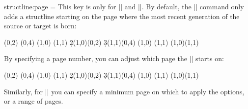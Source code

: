 \begin{sseqdata}[|| name = ex1, cohomological Serre grading]

\begin{key}{structline:page = }
This key is only for |\structline| and |\structlineoptions|. By default, the |\structline| command only adds a structline starting on the page where the most recent generation of the source or target is born:

\begin{codeexample}[width = 7.6cm]
\begin{sseqdata}[ name = structpage example,
                  title = \page, yscale = 0.53 ]
\class(0,2)
\class(0,4)
\class(1,0)
\class(1,1)
\d2(1,0)(0,2)
\d3(1,1)(0,4)
\replaceclass(1,0)
\replaceclass(1,1)
\structline(1,0)(1,1)
\end{sseqdata}
\printpage[name = structpage example,page = 3]
\qquad
\printpage[name = structpage example,page = 4]
\end{codeexample}

By specifying a page number, you can adjust which page the |\structline| starts on:

\begin{codeexample}[]
\begin{sseqdata}[ name = structpage example2, title = \page, yscale = 0.5 ]
\class(0,2)
\class(0,4)
\class(1,0)
\class(1,1)
\d2(1,0)(0,2)
\d3(1,1)(0,4)
\replaceclass(1,0)
\replaceclass(1,1)
\structline[structline:page = 2](1,0)(1,1)
\end{sseqdata}
\printpage[name = structpage example2,page = 1]
\qquad
\printpage[name = structpage example2,page = 2]
\qquad
\printpage[name = structpage example2,page = 3]
\qquad
\printpage[name = structpage example2,page = 4]
\end{codeexample}

Similarly, for |\structlineoptions| you can specify a minimum page on which to apply the options, or a range of pages.
\end{key}


\end{sseqdata}

